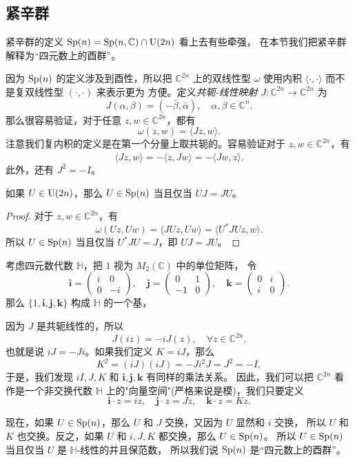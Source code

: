 \subsection{紧辛群}

紧辛群的定义 $\operatorname{Sp}(n)=\operatorname{Sp}(n,\mathbb{C})\cap \operatorname{U}(2n)$ 看上去有些牵强，
在本节我们把紧辛群解释为“四元数上的酉群”。

因为 $\operatorname{Sp}(n)$ 的定义涉及到酉性，所以把 $\mathbb{C}^{2n}$ 上的双线性型
$\omega$ 使用内积 $\langle\cdot,\cdot\rangle$ 而不是复双线性型 $(\cdot,\cdot)$ 来表示更为
方便。定义\emph{共轭-线性映射} $J:\mathbb{C}^{2n}\to \mathbb{C}^{2n}$ 为
\[
  J(\alpha,\beta)=(-\bar\beta,\bar\alpha), \quad \alpha,\beta\in \mathbb{C}^n.
\]
那么很容易验证，对于任意 $z,w\in \mathbb{C}^{2n}$，都有
\[
  \omega(z,w)=\langle Jz,w\rangle.
\]
注意我们复内积的定义是在第一个分量上取共轭的。容易验证对于
$z,w\in \mathbb{C}^{2n}$，有
\[
  \langle Jz,w\rangle=-\overline{\langle z,Jw\rangle}=-\langle Jw,z\rangle.
\]
此外，还有 $J^2=-I$。

\begin{proposition}
  如果 $U\in\operatorname{U}(2n)$，那么 $U\in\operatorname{Sp}(n)$ 当且仅当 $UJ=JU$。
\end{proposition}
\begin{proof}
  对于 $z,w\in \mathbb{C}^{2n}$，有
  \[
    \omega(Uz,Uw)=\langle JUz,Uw\rangle=\langle U^*JUz,w\rangle.
  \]
  所以 $U\in\operatorname{Sp}(n)$ 当且仅当 $U^*JU=J$，即 $UJ=JU$。
\end{proof}

考虑四元数代数 $\mathbb{H}$，把 $1$ 视为 $M_2(\mathbb{C})$ 中的单位矩阵，
令
\[
  \mathbf i=\begin{pmatrix}
    i & 0 \\
    0 & -i
  \end{pmatrix}, \quad
  \mathbf j=\begin{pmatrix}
    0 & 1 \\
    -1 & 0
  \end{pmatrix}, \quad
  \mathbf k=\begin{pmatrix}
    0 & i \\
    i & 0
  \end{pmatrix}.  
\]
那么 $\{1,\mathbf i,\mathbf j,\mathbf k\}$ 构成 $\mathbb{H}$ 的一个基，

因为 $J$ 是共轭线性的，所以
\[
  J(iz)=-iJ(z), \quad \forall z\in \mathbb{C}^{2n}.
\]
也就是说 $iJ=-Ji$。如果我们定义 $K=iJ$，那么
\[
  K^2=(iJ)(iJ)=-Ji^2J=J^2=-I,
\]
于是，我们发现 $iI,J,K$ 和 $\mathbf{i},\mathbf{j},\mathbf{k}$ 有同样的乘法关系。
因此，我们可以把 $\mathbb{C}^{2n}$ 看作是一个非交换代数 $\mathbb{H}$
上的"向量空间"(严格来说是模)，我们只要定义
\[
  \mathbf{i}\cdot z=iz, \quad \mathbf{j}\cdot z=Jz, \quad \mathbf{k}\cdot z=Kz.
\] 

现在，如果 $U\in\operatorname{Sp}(n)$，那么 $U$ 和 $J$ 交换，又因为 $U$ 显然和 $i$ 交换，
所以 $U$ 和 $K$ 也交换。反之，如果 $U$ 和 $i,J,K$ 都交换，那么 $U\in\operatorname{Sp}(n)$。
所以 $U\in\operatorname{Sp}(n)$ 当且仅当 $U$ 是 $\mathbb{H}$-线性的并且保范数，
所以我们说 $\operatorname{Sp}(n)$ 是“四元数上的酉群”。  





